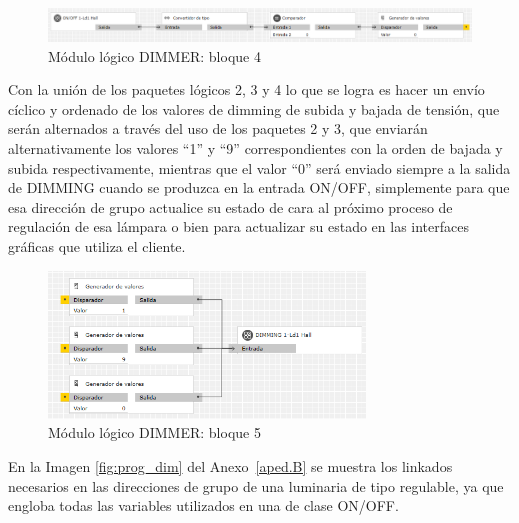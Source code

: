 \begin{figure}[H]
\centering
\includegraphics[width=1.08\textwidth]{figures/log_dimm_b4.png}   
\caption{Módulo lógico DIMMER: bloque 4}
\label{fig:log_dimm_b4}
\end{figure}
Con la unión de los paquetes lógicos 2, 3 y 4 lo que se logra es hacer un envío cíclico y ordenado de los valores de dimming de subida y bajada de tensión, que serán alternados a través del uso de los paquetes 2 y 3, que enviarán alternativamente los valores “1” y “9” correspondientes con la orden de bajada y subida respectivamente, mientras que el valor “0” será enviado siempre a la salida de DIMMING cuando se produzca en la entrada ON/OFF, simplemente para que esa dirección de grupo actualice su estado de cara al próximo proceso de regulación de esa lámpara o bien para actualizar su estado en las interfaces gráficas que utiliza el cliente.
\begin{figure}[H]
\centering
\includegraphics[width=0.75\textwidth]{figures/log_dimm_b5.png}   
\caption{Módulo lógico DIMMER: bloque 5}
\label{fig:log_dimm_b5}
\end{figure}
En la Imagen \ref{fig:prog_dim} del Anexo~\ref{aped.B} se muestra los linkados necesarios en las direcciones de grupo de una luminaria de tipo regulable, ya que engloba todas las variables utilizados en una de clase ON/OFF.

